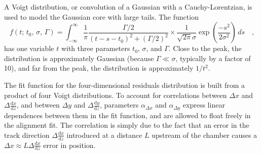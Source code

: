 A Voigt distribution, or convolution of a Gaussian with a
Cauchy-Lorentzian, is used to model the Gaussian core with large tails.
The function
\begin{equation}
f(t; \, t_0, \, \sigma, \, \Gamma) = \int_{-\infty}^\infty
\frac{1}{\pi}\frac{\Gamma/2}{(t - s - t_0)^2 + (\Gamma/2)^2} \times
\frac{1}{\sqrt{2\pi} \sigma} \exp\left(\frac{-s^2}{2
  \sigma^2}\right) \, ds\quad\mbox{,}
\label{eqn:fitfunction}
\end{equation}
has one variable $t$ with three parameters $t_0$, $\sigma$,
and $\Gamma$.  Close to the peak, the distribution is approximately
Gaussian (because $\Gamma \ll \sigma$, typically by a factor of 10), and far from the
peak, the distribution is approximately $1/t^2$.

The fit function for the four-dimensional residuals distribution is
built from a product of four Voigt distributions.  To account for
correlations between $\Delta x$ and $\Delta \frac{\textrm{d}x}{\textrm{d}z}$, and
between $\Delta y$ and $\Delta \frac{\textrm{d}y}{\textrm{d}z}$, parameters
$\alpha_{\Delta x}$ and $\alpha_{\Delta y}$ express linear dependences between
them in the fit function, and are allowed to float freely in the alignment fit.
The correlation is simply due to the fact that an
error in the track direction $\Delta \frac{\textrm{d}x}{\textrm{d}z}$ introduced at a
distance $L$ upstream of the chamber causes a $\Delta x \approx
L \Delta \frac{\textrm{d}x}{\textrm{d}z}$ error in position.

